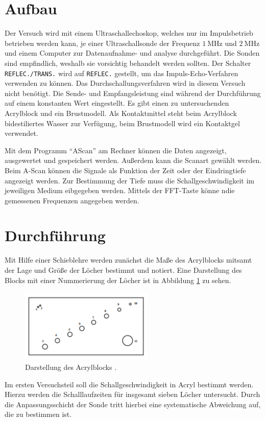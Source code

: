 \section{Aufbau}
Der Versuch wird mit einem Ultraschallechoskop, welches nur im Impulsbetrieb betrieben werden kann, 
je einer Ultraschallsonde der Frequenz $\qty[]{1}{\mega\hertz}$ und $\qty[]{2}{\mega\hertz}$
und einem Computer zur Datenaufnahme- und analyse durchgeführt.
Die Sonden sind empfindlich, weshalb sie vorsichtig behandelt werden sollten.
Der Schalter \texttt{REFLEC./TRANS.} wird auf \texttt{REFLEC.} gestellt, um das Impuls-Echo-Verfahren verwenden zu können.
Das Durchschallungsverfahren wird in diesem Versuch nicht benötigt.
Die Sende- und Empfangsleistung sind während der Durchführung auf einem konstanten Wert eingestellt.
Es gibt einen zu untersuchenden Acrylblock und ein Brustmodell.
Als Kontaktmittel steht beim Acrylblock bidestiliertes Wasser zur Verfügung, beim Brustmodell wird ein Kontaktgel verwendet.



\noindent
Mit dem Programm \enquote{AScan} am Rechner können die Daten angezeigt, ausgewertet und gespeichert werden.
Außerdem kann die Scanart gewählt werden.
Beim A-Scan können die Signale als Funktion der Zeit oder der Eindringtiefe angezeigt werden.
Zur Bestimmung der Tiefe muss die Schallgeschwindigkeit im jeweiligen Medium eibgegeben werden.
Mittels der FFT-Taste könne ndie gemessenen Frequenzen angegeben werden.




\section{Durchführung}
Mit Hilfe einer Schieblehre werden zunächst die Maße des Acrylblocks mitsamt der Lage und Größe der Löcher bestimmt und notiert.
Eine Darstellung des Blocks mit einer Nummerierung der Löcher ist in Abbildung \ref{fig:acrylblock} zu sehen.

\begin{figure}[H]
    \centering
    \includegraphics*[height=3.5cm]{Abbildungen/acrylblock.png}
    \caption*{Darstellung des Acrylblocks \cite[]{man:us1}.}
    \label{fig:acrylblock}
\end{figure}

\noindent
Im ersten Versuchsteil soll die Schallgeschwindigkeit in Acryl bestimmt werden.
Hierzu werden die Schalllaufzeiten für insgesamt sieben Löcher untersucht.
Durch die Anpassungsschicht der Sonde tritt hierbei eine systematische Abweichung auf, die zu bestimmen ist.


